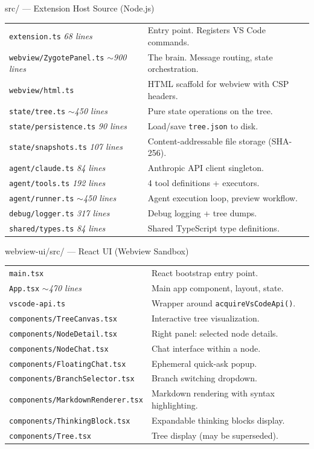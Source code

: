 \documentclass[12pt, a4paper]{article}
\begin{document}
\begin{filebox}{src/ --- Extension Host Source (Node.js)}
\begin{tabular}{@{}p{6.5cm}p{7.5cm}@{}}
\texttt{extension.ts} \hfill \textit{68 lines} & Entry point. Registers VS Code commands. \\
\texttt{webview/ZygotePanel.ts} \hfill \textit{$\sim$900 lines} & The brain. Message routing, state orchestration. \\
\texttt{webview/html.ts} & HTML scaffold for webview with CSP headers. \\
\texttt{state/tree.ts} \hfill \textit{$\sim$450 lines} & Pure state operations on the tree. \\
\texttt{state/persistence.ts} \hfill \textit{90 lines} & Load/save \texttt{tree.json} to disk. \\
\texttt{state/snapshots.ts} \hfill \textit{107 lines} & Content-addressable file storage (SHA-256). \\
\texttt{agent/claude.ts} \hfill \textit{84 lines} & Anthropic API client singleton. \\
\texttt{agent/tools.ts} \hfill \textit{192 lines} & 4 tool definitions + executors. \\
\texttt{agent/runner.ts} \hfill \textit{$\sim$450 lines} & Agent execution loop, preview workflow. \\
\texttt{debug/logger.ts} \hfill \textit{317 lines} & Debug logging + tree dumps. \\
\texttt{shared/types.ts} \hfill \textit{84 lines} & Shared TypeScript type definitions. \\
\end{tabular}
\end{filebox}

\begin{filebox}{webview-ui/src/ --- React UI (Webview Sandbox)}
\begin{tabular}{@{}p{6.5cm}p{7.5cm}@{}}
\texttt{main.tsx} & React bootstrap entry point. \\
\texttt{App.tsx} \hfill \textit{$\sim$470 lines} & Main app component, layout, state. \\
\texttt{vscode-api.ts} & Wrapper around \texttt{acquireVsCodeApi()}. \\
\texttt{components/TreeCanvas.tsx} & Interactive tree visualization. \\
\texttt{components/NodeDetail.tsx} & Right panel: selected node details. \\
\texttt{components/NodeChat.tsx} & Chat interface within a node. \\
\texttt{components/FloatingChat.tsx} & Ephemeral quick-ask popup. \\
\texttt{components/BranchSelector.tsx} & Branch switching dropdown. \\
\texttt{components/MarkdownRenderer.tsx} & Markdown rendering with syntax highlighting. \\
\texttt{components/ThinkingBlock.tsx} & Expandable thinking blocks display. \\
\texttt{components/Tree.tsx} & Tree display (may be superseded). \\
\end{tabular}
\end{filebox}
\end{document}
